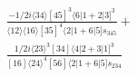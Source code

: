 \documentclass[varwidth, border=5pt]{standalone}
\begin{document}
\begin{my}
$\begin{gathered}
\scriptscriptstyle\frac{-1/2i\langle34\rangle[45]^3\langle6|1+2|3]^3}{\langle12\rangle\langle16\rangle[35]^4\langle2|1+6|5]s_{345}}+\\
\scriptscriptstyle\frac{1/2i\langle23\rangle^3[34]\langle4|2+3|1]^3}{[16]\langle24\rangle^4[56]\langle2|1+6|5]s_{234}}\phantom{+}
\end{gathered}$
\end{my}
\end{document}
